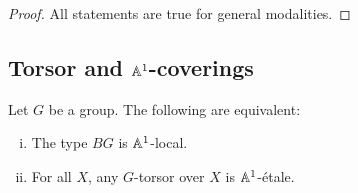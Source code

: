 \begin{proof}
  All statements are true for general modalities.
\end{proof}

\subsection{Torsor and $\mathbb{A}^1$-coverings}

\begin{proposition}
Let $G$ be a group. The following are equivalent:
\begin{enumerate}[(i)]
\item The type $BG$ is $\mathbb{A}^1$-local.
\item For all $X$, any $G$-torsor over $X$ is $\mathbb{A}^1$-étale.
\end{enumerate}
\end{proposition}

